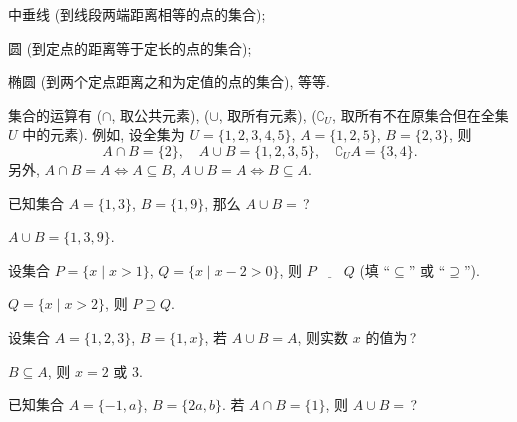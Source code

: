 中垂线 (到线段两端距离相等的点的集合);

圆 (到定点的距离等于定长的点的集合);

椭圆 (到两个定点距离之和为定值的点的集合), 等等.

集合的运算有 ($\cap$, 取公共元素), 
 ($\cup$, 取所有元素),
 ($\complement_U$, 取所有不在原集合但在全集 $U$ 中的元素).
例如, 设全集为 $U=\{1,2,3,4,5\}$, $A=\{1,2,5\}$, $B=\{2,3\}$, 则
\[A\cap B=\{2\},\quad A\cup B=\{1,2,3,5\},\quad 
  \complement_U A=\{3,4\}.\]
另外, $A\cap B= A\Leftrightarrow A\subseteq B$, 
$A\cup B= A\Leftrightarrow B\subseteq A$.

\lianxi
\begin{exercise}
  已知集合 $A=\{1,3\}$, $B=\{1,9\}$, 那么 $A\cup B=$\,?
\end{exercise}

\beginsolution
  $A\cup B=\{1,3,9\}$.
\endsolution

\begin{exercise}
  设集合 $P=\{x\mid x>1\}$, $Q=\{x\mid x-2>0\}$, 则 $P\underline{\qquad}Q$
  (填 ``$\subseteq$'' 或 ``$\supseteq$'').
\end{exercise}

\beginsolution
  $Q=\{x\mid x>2\}$, 则 $P\supseteq Q$.
\endsolution

\begin{exercise}
  设集合 $A=\{1,2,3\}$, $B=\{1,x\}$, 若 $A\cup B=A$, 则实数 $x$ 的值为\,?
\end{exercise}

\beginsolution
  \(B\subseteq A\), 则 \(x=2\) 或 \(3\).
\endsolution

\begin{exercise}
  已知集合 $A=\{-1,a\}$, $B=\{2a,b\}$. 若 $A\cap B=\{1\}$, 则 $A\cup B=$\,?
\end{exercise}

